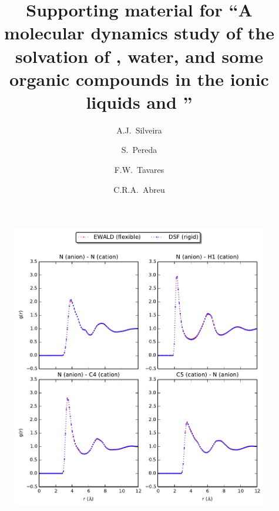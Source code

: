 \documentclass[3p,onecolumn]{elsarticle}
\begin{document}
\begin{frontmatter}

\title{Supporting material for ``A molecular dynamics study of the solvation of , water, and some organic compounds in the ionic liquids \ce{[emim][B(CN)_4]} and \ce{[emim][NTf_2]}''}

\author[rvt]{A.J.~Silveira}
\author[rvt]{S.~Pereda}
\author[focal,els]{F.W.~Tavares}
\author[focal]{C.R.A.~Abreu}

\address[rvt]{Planta Piloto de Ingenier\'ia Qu\'imica, PLAPIQUI, Universidad Nacional del Sur,Camino La Carrindanga Km 7-CC: 717, Bah\'ia Blanca, Argentina}
\address[focal]{Chemical Engineering Department, Escola de Qu\'imica, Universidade Federal do Rio de Janeiro,Rio de Janeiro, RJ 21941-909, Brazil}
\address[els]{COPPE, Universidade Federal do Rio de Janeiro, Rio de Janeiro, RJ 21941-909, Brazil}

\end{frontmatter}

\begin{figure}[ht]
\includegraphics[]{rdf-koller}
\caption{\ce{[emim][B(CN)_4]}}
\label{fig:pressure}
\end{figure}
\end{document}
